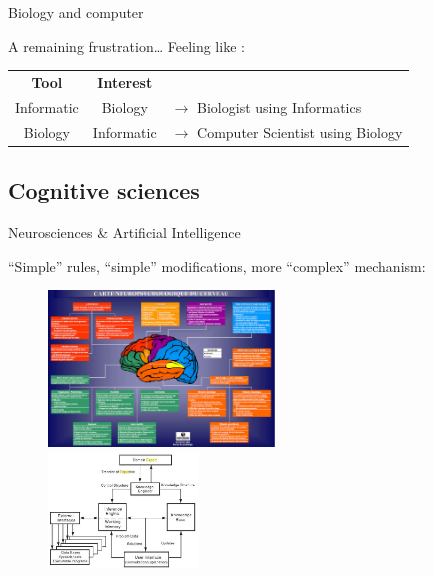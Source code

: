 \documentclass[8pt, handout=show,notes=show]{beamer}
\begin{document}
\begin{frame}{Biology and computer}
    \begin{alertblock}	{ A remaining frustration\ldots} 
	\vfill
	Feeling like :
	\vfill
	\begin{table}
	    \centering
	    \begin{tabular}{c|cl}
		\textbf{Tool} & \textbf{Interest} & \\\cline{1-2}
		Informatic & Biology &  $\rightarrow$ Biologist using Informatics  \\
		Biology & Informatic& $\rightarrow$ Computer Scientist using Biology\\
	    \end{tabular}
	\end{table}
    \end{alertblock}
\end{frame}

\subsection{Cognitive sciences}

\begin{frame}{Neurosciences \& Artificial Intelligence}

    ``Simple'' rules, ``simple'' modifications, more ``complex'' mechanism:\\
    \begin{figure}
	\includegraphics[width=6cm]{images/cogscience.jpg}\\
	\includegraphics[width=4cm]{images/ai.jpg}
    \end{figure}
    
\end{frame}
\end{document}
